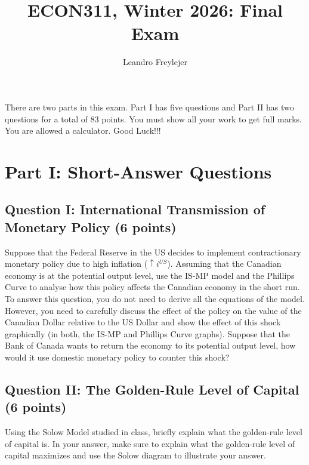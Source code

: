 \documentclass[letterpaper,12pt]{article}
\title{\vspace{-1in}ECON311, Winter 2026: Final Exam}
\author{Leandro Freylejer}
\date{}
\theoremstyle{dotlessS}
\begin{document}
\maketitle
\noindent There are two parts in this exam. Part I has five questions and Part II has two questions for a total of 83 points. You must show all your work to get full marks. You are allowed a calculator. Good Luck!!!
\section{Part I: Short-Answer Questions}

\subsection*{Question I: International Transmission of Monetary Policy (6 points)}
Suppose that the Federal Reserve in the US decides to implement contractionary monetary policy due to high inflation ($\uparrow i^{US}$). Assuming that the Canadian economy is at the potential output level, use the IS-MP model and the Phillips Curve to analyse how this policy affects the Canadian economy in the short run. To answer this question, you do not need to derive all the equations of the model. However, you need to carefully discuss the effect of the policy on the value of the Canadian Dollar relative to the US Dollar and show the effect of this shock graphically (in both, the IS-MP and Phillips Curve graphs). Suppose that the Bank of Canada wants to return the economy to its potential output level, how would it use domestic monetary policy to counter this shock?     

\subsection*{Question II: The Golden-Rule Level of Capital (6 points)}
Using the Solow Model studied in class, briefly explain what the golden-rule level of capital is. In your answer, make sure to explain what the golden-rule level of capital maximizes and use the Solow diagram to illustrate your answer.
\end{document}
